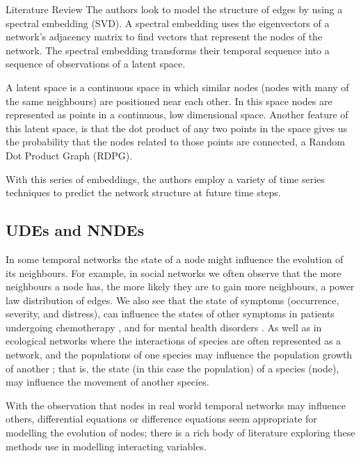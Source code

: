 \documentclass[12pt]{amsart}
\begin{document}
\begin{section}{Literature Review}
        The authors look to model the structure of edges by using a spectral embedding (SVD). A spectral embedding uses the eigenvectors of a network's adjacency matrix to find vectors that represent the nodes of the network. The spectral embedding transforms their temporal sequence into a sequence of observations of a latent space. 
        
        A latent space is a continuous space in which similar nodes (nodes with many of the same neighbours) are positioned near each other. In this space nodes are represented as points in a continuous, low dimensional space. Another feature of this latent space, is that the dot product of any two points in the space gives us the probability that the nodes related to those points are connected, a Random Dot Product Graph (RDPG)\cite{athreya2017statistical}. 
        
        With this series of embeddings, the authors employ a variety of time series techniques to predict the network structure at future time steps.

    \subsection{UDEs and NNDEs}
        In some temporal networks the state of a node might influence the evolution of its neighbours. For example, in social networks we often observe that the more neighbours a node has, the more likely they are to gain more neighbours, a power law distribution of edges\cite{zhao2012multi,garg2009evolution}. We also see that the state of symptoms (occurrence, severity, and distress), can influence the states of other symptoms in patients undergoing chemotherapy \cite{papachristou2019network,kalantari2022network}, and for mental health disorders \cite{contreras2020temporal}. As well as in ecological networks where the interactions of species are often represented as a network, and the populations of one species may influence the population growth of another \cite{elton2001animal,volterra1927variazioni}; that is, the state (in this case the population) of a species (node), may influence the movement of another species.
        
        With the observation that nodes in real world temporal networks may influence others, differential equations or difference equations seem appropriate for modelling the evolution of nodes; there is a rich body of literature exploring these methods use in modelling interacting variables. 
        

\end{section}
\end{document}

